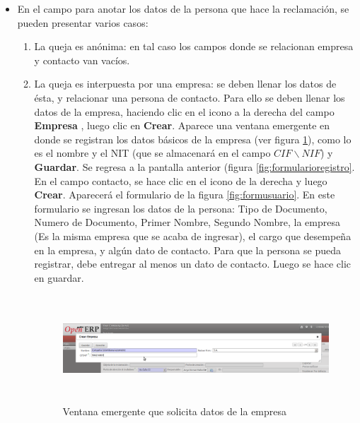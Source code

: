 \begin{itemize}
 \item En el campo para anotar los datos de la persona que hace la reclamación, se pueden presentar varios casos: 
 \begin{enumerate}
  \item La queja es anónima: en tal caso los campos donde se relacionan empresa y contacto van vacíos. 
  \item La queja es interpuesta por una empresa: se deben llenar los datos de ésta, y relacionar una persona de contacto. Para ello se deben llenar 
  los datos de la empresa, haciendo clic en el icono a la derecha del campo 
  \textbf{Empresa} , luego clic en \textbf{Crear}. Aparece una ventana emergente en donde se registran los
  datos básicos de la empresa (ver figura \ref{fig:pantempresa}), como lo es el nombre y el NIT (que se almacenará en el campo $CIF\backslash NIF$) 
  y \textbf{Guardar}. Se regresa a la pantalla anterior (figura \ref{fig:formularioregistro}. 
  En el campo contacto, se hace clic en el icono de la derecha y luego \textbf{Crear}. Aparecerá el formulario de la figura \ref{fig:formusuario}.
  En este formulario se ingresan los datos de la persona: Tipo de Documento, Numero de Documento, Primer Nombre, Segundo Nombre, la 
  empresa (Es la misma empresa que se acaba de ingresar), el cargo que desempeña en la empresa, y algún dato de contacto. Para que la 
  persona se pueda registrar, debe entregar al menos un dato de contacto.  Luego se hace clic en guardar.
  \begin{figure}[H]
  \centering
  \includegraphics[width=17cm,height=4cm]{./Imagenes/pantempresa.png}
  \caption{Ventana emergente que solicita datos de la empresa}
  \label{fig:pantempresa}
  \end{figure}


\end{enumerate}
\end{itemize}

